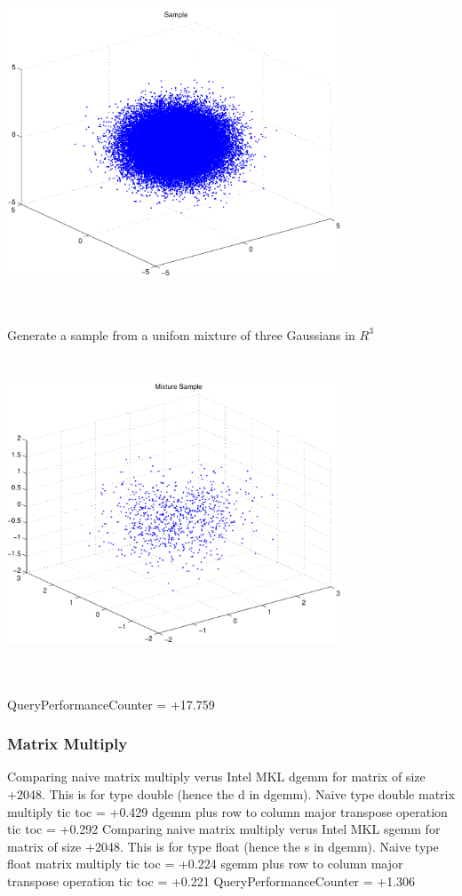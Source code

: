 \documentclass[9pt]{article}
\theoremstyle{plain}
\theoremstyle{definition}
\theoremstyle{remark}
\numberwithin{equation}{section}
\begin{document}
\includegraphics[width=10.0cm,height=10.0cm]{R_3_Normal.pdf}

Generate a sample from a unifom mixture of three Gaussians in $R^3$
\includegraphics[width=10.0cm,height=10.0cm]{R_3_Normal_Mixture.pdf}

QueryPerformanceCounter  =  +17.759
\subsubsection{Matrix Multiply}
Comparing naive matrix multiply verus Intel MKL dgemm for matrix of size +2048.
This is for type double (hence the d in dgemm).
Naive type double matrix multiply tic toc  =  +0.429
dgemm plus row to column major transpose operation tic toc  =  +0.292
Comparing naive matrix multiply verus Intel MKL sgemm for matrix of size +2048.
This is for type float (hence the s in dgemm).
Naive type float matrix multiply tic toc  =  +0.224
sgemm plus row to column major transpose operation tic toc  =  +0.221
QueryPerformanceCounter  =  +1.306
\end{document}
